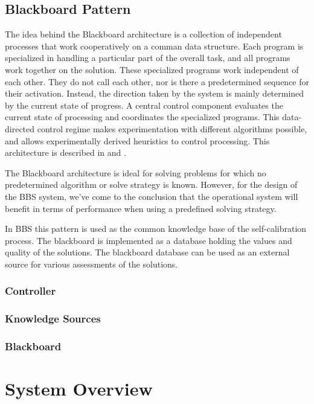 \documentclass[10pt]{lofar}
\begin{document}
\subsection{Blackboard Pattern}
\label{subsec:blackboard}
The idea behind the Blackboard architecture is a collection of independent processes that work cooperatively on a comman data structure. Each program is specialized in handling a particular part of the overall task, and all programs work together on the solution. These specialized programs work independent of each other. They do not call each other, nor is there a predetermined sequence for their activation. Instead, the direction taken by the system is mainly determined by the current state of progress. A central control component evaluates the current state of processing and coordinates the specialized programs. This data-directed control regime makes experimentation with different algorithms possible, and allows experimentally derived heuristics to control processing. This architecture is described in \cite{Buschmann1996} and \cite{LOFAR-ASTRON-SDD-002}.

The Blackboard architecture is ideal for solving problems for which no predetermined algorithm or solve strategy is known. However, for the design of the BBS system, we've come to the conclusion that the operational system will benefit in terms of performance when using a predefined solving strategy.

In BBS this pattern is used as the common knowledge base of the self-calibration process. The blackboard is implemented as a database holding the values and quality of the solutions. The blackboard database can be used as an external source for various assessments of the solutions.
\subsubsection{Controller}
\label{subsubsec:controller}

\subsubsection{Knowledge Sources}
\label{subsubsec:ks}

\subsubsection{Blackboard}
\label{subsubsec:bb}


\pagebreak

\section{System Overview}
\label{sec:overview}
\end{document}
